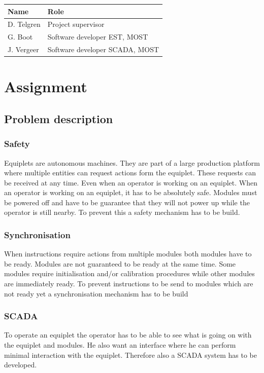 \documentclass[12pt,a4paper]{report}
\begin{document}
\begin{tabular}{l | l}
Name       & Role \\
\hline
D. Telgren & Project supervisor \\
G. Boot    & Software developer EST, MOST \\
J. Vergeer & Software developer SCADA, MOST
\end{tabular}

\chapter{Assignment}

\section{Problem description}

\subsection{Safety}
Equiplets are autonomous machines. 
They are part of a large production platform where multiple entities can request actions form the equiplet.
These requests can be received at any time.
Even when an operator is working on an equiplet.
When an operator is working on an equiplet, it has to be absolutely safe.
Modules must be powered off and have to be guarantee that they will not power up while the operator is still nearby.
To prevent this a safety mechanism has to be build.

\subsection{Synchronisation}
When instructions require actions from multiple modules both modules have to be ready.
Modules are not guaranteed to be ready at the same time. Some modules require initialisation  and/or calibration procedures while other modules are immediately ready.
To prevent instructions to be send to modules which are not ready yet a synchronisation mechanism has to be build

\subsection{SCADA}
To operate an equiplet the operator has to be able to see what is going on with the equiplet and modules. He also want an interface where he can perform minimal interaction with the equiplet. Therefore also a SCADA system has to be developed.
\end{document}
